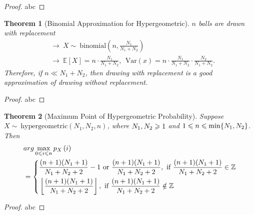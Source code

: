\documentclass[openany,12pt]{book}
\newtheorem{theorem}{Theorem}[chapter]
\begin{document}
\begin{proof}
  abc
\end{proof}

\begin{theorem}[Binomial Approximation for Hypergeometric]
$n$ balls are drawn with replacement
$$\begin{aligned}
  &\to\ X\sim\ \mathrm{binomial}\left(n,\frac{N_1}{N_1+N_2}\right)\\
&\to\ \mathbb{E}\left[X\right]=n\cdot\frac{N_1}{N_1+N_2},\ \ \mathrm{Var}(x)=n\cdot\frac{N_1}{N_1+N_2}\cdot\frac{N_2}{N_1+N_2}.
\end{aligned}
$$
Therefore, if $n\ll N_1+N_2$, then drawing with replacement is a good approximation of drawing without replacement.
\end{theorem}

\begin{proof}
  abc
\end{proof}

\begin{theorem}[Maximum Point of Hypergeometric Probability]
Suppose $X\sim\ \mathrm{hypergeometric}(N_1,N_2,n)$, where $N_1,N_2\geqslant1$ and $1\leqslant n\leqslant\min\{N_1,N_2\}$. Then
$$
\begin{aligned}
&arg\max_{0\ls i\ls n}{p_X\left(i\right)}\\
&=\left\{\begin{aligned}
&\frac{(n+1)(N_1+1)}{N_1+N_2+2}-1 \text{ or } \frac{(n+1)(N_1+1)}{N_1+N_2+2},     \ \text{if }  \frac{(n+1)(N_1+1)}{N_1+N_2+2}\in\mz   \\
&\left\lfloor \frac{(n+1)(N_1+1)}{N_1+N_2+2}\right\rfloor, \ \text{if }  \frac{(n+1)(N_1+1)}{N_1+N_2+2}\notin\mz  
\end{aligned}\right.   
\end{aligned}
$$
\end{theorem}

\begin{proof}
  abc
\end{proof}
\end{document}
